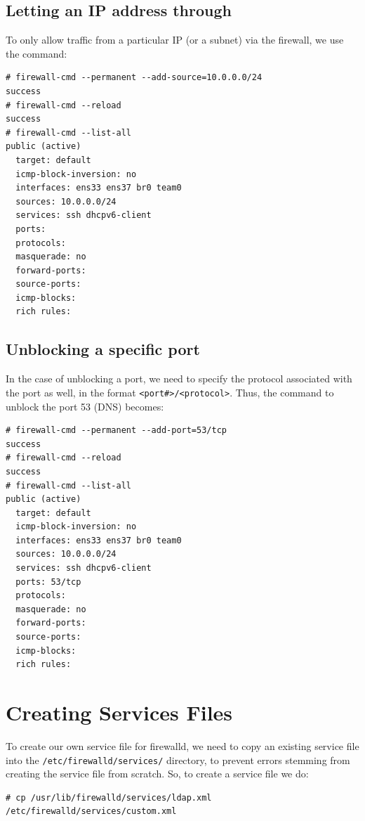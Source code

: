\subsection{Letting an IP address through}
To only allow traffic from a particular IP (or a subnet) via the firewall, we use the command:

\vspace{-15pt}
\begin{verbatim}
# firewall-cmd --permanent --add-source=10.0.0.0/24 
success
# firewall-cmd --reload
success
# firewall-cmd --list-all
public (active)
  target: default
  icmp-block-inversion: no
  interfaces: ens33 ens37 br0 team0
  sources: 10.0.0.0/24
  services: ssh dhcpv6-client
  ports: 
  protocols: 
  masquerade: no
  forward-ports: 
  source-ports: 
  icmp-blocks: 
  rich rules: 
\end{verbatim}
\vspace{-10pt}	

\subsection{Unblocking a specific port}
In the case of unblocking a port, we need to specify the protocol associated with the port as well, in the format \verb|<port#>/<protocol>|. Thus, the command to unblock the port 53 (DNS) becomes:

\vspace{-15pt}
\begin{verbatim}
# firewall-cmd --permanent --add-port=53/tcp
success
# firewall-cmd --reload
success
# firewall-cmd --list-all
public (active)
  target: default
  icmp-block-inversion: no
  interfaces: ens33 ens37 br0 team0
  sources: 10.0.0.0/24
  services: ssh dhcpv6-client
  ports: 53/tcp
  protocols: 
  masquerade: no
  forward-ports: 
  source-ports: 
  icmp-blocks: 
  rich rules: 
\end{verbatim}

\section{Creating Services Files}
To create our own service file for firewalld, we need to copy an existing service file into the \verb|/etc/firewalld/services/| directory, to prevent errors stemming from creating the service file from scratch. So, to create a service file we do:

\vspace{-15pt}
\begin{verbatim}
# cp /usr/lib/firewalld/services/ldap.xml /etc/firewalld/services/custom.xml
\end{verbatim}
\vspace{-10pt}	

